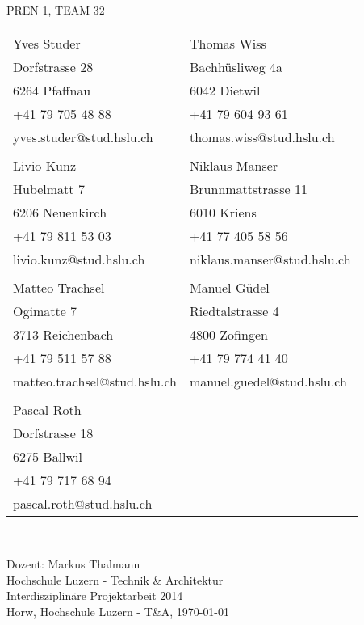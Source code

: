 \begin{titlepage}
    \begin{center}
        {\Huge PREN 1, TEAM 32\par}
        \vspace{3em}
        \begin{tabular}{ll}
        Yves Studer                & Thomas Wiss \\
        Dorfstrasse 28             & Bachhüsliweg 4a \\
        6264 Pfaffnau              & 6042 Dietwil \\
        +41 79 705 48 88           & +41 79 604 93 61 \\
        yves.studer@stud.hslu.ch   & thomas.wiss@stud.hslu.ch \\
                                   & \\
        Livio Kunz                 & Niklaus Manser \\
        Hubelmatt 7                & Brunnmattstrasse 11\\
        6206 Neuenkirch            & 6010 Kriens \\
        +41 79 811 53 03           & +41 77 405 58 56 \\
        livio.kunz@stud.hslu.ch    & niklaus.manser@stud.hslu.ch \\
                                   & \\
        Matteo Trachsel			   & Manuel Güdel \\
        Ogimatte 7                 & Riedtalstrasse 4\\
        3713 Reichenbach           & 4800 Zofingen\\
        +41 79 511 57 88           & +41 79 774 41 40 \\
        matteo.trachsel@stud.hslu.ch & manuel.guedel@stud.hslu.ch \\
        						   & \\
        Pascal Roth			       & \\
        Dorfstrasse 18			   & \\
        6275 Ballwil		       & \\
        +41 79 717 68 94	       & \\
        pascal.roth@stud.hslu.ch   & \\
        \end{tabular}\\
        \vspace{5em}
        {\huge \myTitel\par}
        \vspace{5em}
        Dozent: Markus Thalmann\\
        \vspace{2em}
        Hochschule Luzern - Technik \& Architektur \\   
        Interdisziplinäre Projektarbeit 2014
        \vspace{13em}\\
        Horw, Hochschule Luzern - T\&A, \today
    \end{center}
\end{titlepage}